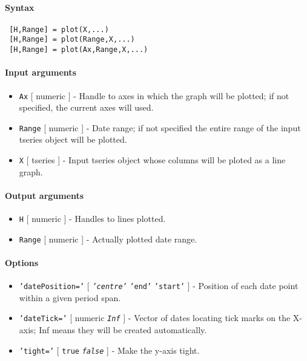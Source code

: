 


	\paragraph{Syntax}
 
 \begin{verbatim}
 [H,Range] = plot(X,...)
 [H,Range] = plot(Range,X,...)
 [H,Range] = plot(Ax,Range,X,...)
 \end{verbatim}
 
 \paragraph{Input arguments}
 
 \begin{itemize}
 \item
   \texttt{Ax} {[} numeric {]} - Handle to axes in which the graph will
   be plotted; if not specified, the current axes will used.
 \item
   \texttt{Range} {[} numeric {]} - Date range; if not specified the
   entire range of the input tseries object will be plotted.
 \item
   \texttt{X} {[} tseries {]} - Input tseries object whose columns will
   be ploted as a line graph.
 \end{itemize}
 
 \paragraph{Output arguments}
 
 \begin{itemize}
 \item
   \texttt{H} {[} numeric {]} - Handles to lines plotted.
 \item
   \texttt{Range} {[} numeric {]} - Actually plotted date range.
 \end{itemize}
 
 \paragraph{Options}
 
 \begin{itemize}
 \item
   \texttt{'datePosition='} {[} \emph{\texttt{'centre'}} \textbar{}
   \texttt{'end'} \textbar{} \texttt{'start'} {]} - Position of each date
   point within a given period span.
 \item
   \texttt{'dateTick='} {[} numeric \textbar{} \emph{\texttt{Inf}} {]} -
   Vector of dates locating tick marks on the X-axis; Inf means they will
   be created automatically.
 \item
   \texttt{'tight='} {[} \texttt{true} \textbar{} \emph{\texttt{false}}
   {]} - Make the y-axis tight.
 \end{itemize}
 
